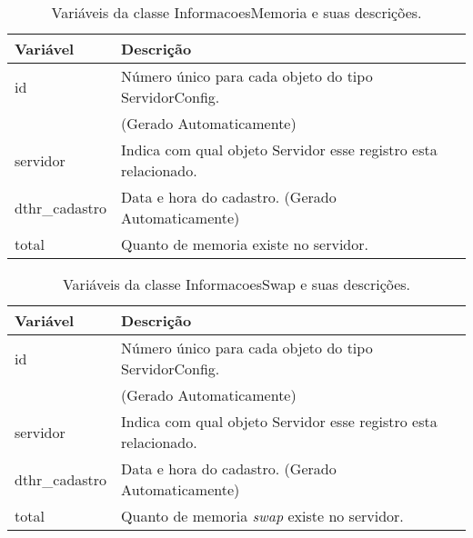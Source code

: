 \begin{table}[!ht]
\centering
\begin{tabular}{|l|l|}
\hline
{\color[HTML]{000000} \textbf{Variável}} & {\color[HTML]{000000} \textbf{Descrição}}                                      \\ \hline
id                                       & Número único para cada objeto do tipo ServidorConfig.\\ 
																				 &(Gerado Automaticamente) 																												\\ \hline
servidor                                 & Indica com qual objeto Servidor esse registro esta relacionado.                       \\ \hline
dthr\_cadastro                           & Data e hora do cadastro. (Gerado Automaticamente)                              \\ \hline
total                                    & Quanto de memoria existe no servidor.                                          \\ \hline
\end{tabular}
\caption[Variáveis da classe InformacoesMemoria e suas descrições.]{Variáveis da classe InformacoesMemoria e suas descrições.}
\label{Tab:VariaveisInformacoesMemoria}
\end{table}


\begin{table}[!ht]
\centering
\begin{tabular}{|l|l|}
\hline
{\color[HTML]{000000} \textbf{Variável}} & {\color[HTML]{000000} \textbf{Descrição}}                                      \\ \hline
id                                       & Número único para cada objeto do tipo ServidorConfig.\\ 
																				 &(Gerado Automaticamente) 																												\\ \hline
servidor                                 & Indica com qual objeto Servidor esse registro esta relacionado.                       \\ \hline
dthr\_cadastro                           & Data e hora do cadastro. (Gerado Automaticamente)                              \\ \hline
total                                    & Quanto de memoria \textit{swap} existe no servidor.                                     \\ \hline
\end{tabular}
\caption[Variáveis da classe InformacoesSwap e suas descrições.]{Variáveis da classe InformacoesSwap e suas descrições.}
\label{Tab:VariaveisInformacoesSwap}
\end{table}


